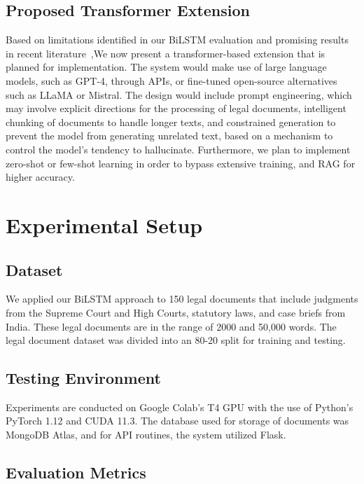 \documentclass[preprint,12pt]{elsarticle}
\begin{document}
\subsection{Proposed Transformer Extension}

Based on limitations identified in our BiLSTM evaluation and promising results in recent literature~\cite{nigam2023legal,sharma2024legal,albayati2025multi},We now present a transformer-based extension that is planned for implementation. The system would make use of large language models, such as GPT-4, through APIs, or fine-tuned open-source alternatives such as LLaMA or Mistral. The design would include prompt engineering, which may involve explicit directions for the processing of legal documents, intelligent chunking of documents to handle longer texts, and constrained generation to prevent the model from generating unrelated text, based on a mechanism to control the model's tendency to hallucinate. Furthermore, we plan to implement zero-shot or few-shot learning in order to bypass extensive training, and RAG for higher accuracy.

\section{Experimental Setup}

\subsection{Dataset}

We applied our BiLSTM approach to 150 legal documents that include judgments from the Supreme Court and High Courts, statutory laws, and case briefs from India. These legal documents are in the range of 2000 and 50,000 words. The legal document dataset was divided into an 80-20 split for training and testing.

\subsection{Testing Environment}

Experiments are conducted on Google Colab’s T4 GPU with the use of Python’s PyTorch 1.12 and CUDA 11.3. The database used for storage of documents was MongoDB Atlas, and for API routines, the system utilized Flask.

\subsection{Evaluation Metrics}
\end{document}
